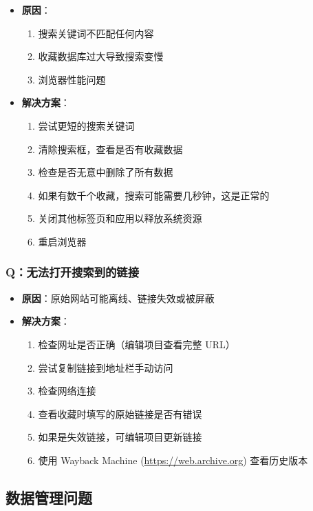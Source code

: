 \documentclass[10pt,a4paper]{article}
\begin{document}
\begin{itemize}
\begin{itemize}
\begin{itemize}
\begin{itemize}
  \item \textbf{原因}：
    \begin{enumerate}
      \item 搜索关键词不匹配任何内容
      \item 收藏数据库过大导致搜索变慢
      \item 浏览器性能问题
    \end{enumerate}
  \item \textbf{解决方案}：
    \begin{enumerate}
      \item 尝试更短的搜索关键词
      \item 清除搜索框，查看是否有收藏数据
      \item 检查是否无意中删除了所有数据
      \item 如果有数千个收藏，搜索可能需要几秒钟，这是正常的
      \item 关闭其他标签页和应用以释放系统资源
      \item 重启浏览器
    \end{enumerate}
\end{itemize}

\subsubsection{Q：无法打开搜索到的链接}

\begin{itemize}
  \item \textbf{原因}：原始网站可能离线、链接失效或被屏蔽
  \item \textbf{解决方案}：
    \begin{enumerate}
      \item 检查网址是否正确（编辑项目查看完整 URL）
      \item 尝试复制链接到地址栏手动访问
      \item 检查网络连接
      \item 查看收藏时填写的原始链接是否有错误
      \item 如果是失效链接，可编辑项目更新链接
      \item 使用 Wayback Machine (\url{https://web.archive.org}) 查看历史版本
    \end{enumerate}
\end{itemize}

\subsection{数据管理问题}


\end{itemize}
\end{itemize}
\end{itemize}
\end{document}
